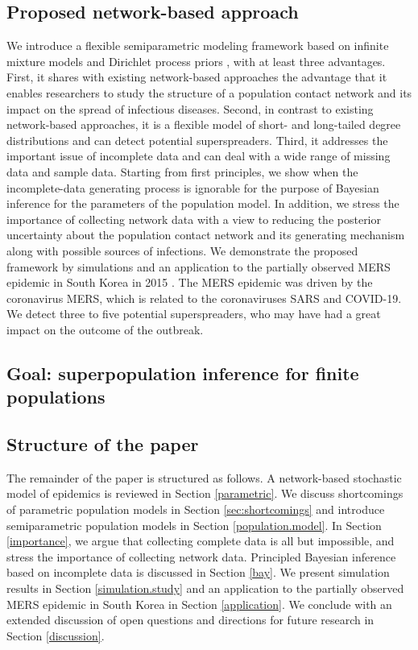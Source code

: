 \documentclass[12pt,usenatbib,referee]{article}
\renewcommand{\alert}{\textcolor{black}}
\begin{document}
\subsection{Proposed network-based approach}

We introduce a flexible semiparametric modeling framework based on infinite mixture models and Dirichlet process priors \citep{Fe73,Teh2007},
with at least three advantages.
First,
it shares with existing network-based approaches the advantage that it enables researchers to study the structure of a population contact network and its impact on the spread of infectious diseases.
Second,
in contrast to existing network-based approaches,
it is a flexible model of short- and long-tailed degree distributions and can detect potential superspreaders.
Third,
it addresses the important issue of incomplete data and can deal with a wide range of missing data and sample data.
Starting from first principles,
we show when the incomplete-data generating process is ignorable for the purpose of Bayesian inference for the parameters of the population model.
In addition,
we stress the importance of collecting network data with a view to reducing the posterior uncertainty about the population contact network and its generating mechanism along with possible sources of infections.
We demonstrate the proposed framework by simulations and an application to the partially observed MERS epidemic in South Korea in 2015 \citep{Ki15}.
The MERS epidemic was driven by the coronavirus MERS,
which is related to the coronaviruses SARS and COVID-19.
We detect three to five potential superspreaders,
who may have had a great impact on the outcome of the outbreak.

\subsection{Goal: superpopulation inference for finite populations}

\alert{}

\subsection{Structure of the paper}

The remainder of the paper is structured as follows.
A network-based stochastic model of epidemics is reviewed in Section \ref{parametric}.
We discuss shortcomings of parametric population models in Section \ref{sec:shortcomings} and introduce semiparametric population models in Section \ref{population.model}.
In Section \ref{importance},
we argue that collecting complete data is all but impossible,
and stress the importance of collecting network data.
Principled Bayesian inference based on incomplete data is discussed in Section \ref{bay}.
We present simulation results in Section \ref{simulation.study} and an application to the partially observed MERS epidemic in South Korea in Section \ref{application}.
We conclude with an extended discussion of open questions and directions for future research in Section \ref{discussion}.
\end{document}
